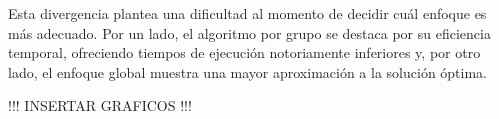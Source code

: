 Esta divergencia plantea una dificultad al momento de decidir cuál enfoque es más adecuado. Por un lado, el algoritmo por grupo se destaca por su eficiencia temporal, ofreciendo tiempos de ejecución notoriamente inferiores y, por otro lado, el enfoque global muestra una mayor aproximación a la solución óptima.

!!! INSERTAR GRAFICOS !!!


